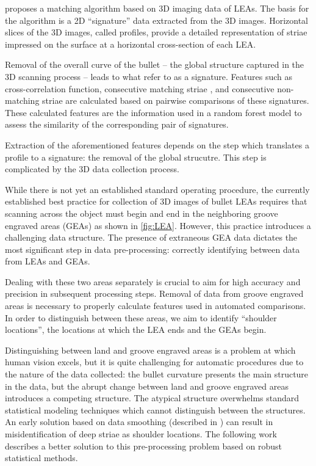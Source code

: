 \documentclass[]{article}
\begin{document}
\citet{Hare1} proposes a matching algorithm based on 3D imaging data of
LEAs. The basis for the algorithm is a 2D ``signature'' data extracted
from the 3D images. Horizontal slices of the 3D images, called profiles,
provide a detailed representation of striae impressed on the surface at
a horizontal cross-section of each LEA.

Removal of the overall curve of the bullet -- the global structure
captured in the 3D scanning process -- leads to what \citet{Hare1} refer
to as a signature. Features such as cross-correlation function,
consecutive matching striae \citep[see][]{Biasotti}, and consecutive
non-matching striae are calculated based on pairwise comparisons of
these signatures. These calculated features are the information used in
a random forest model to assess the similarity of the corresponding pair
of signatures.

Extraction of the aforementioned features depends on the step which
translates a profile to a signature: the removal of the global
strucutre. This step is complicated by the 3D data collection process.

While there is not yet an established standard operating procedure, the
currently established best practice for collection of 3D images of
bullet LEAs requires that scanning across the object must begin and end
in the neighboring groove engraved areas (GEAs) as shown in
\autoref{fig:LEA}. However, this practice introduces a challenging data
structure. The presence of extraneous GEA data dictates the most
significant step in data pre-processing: correctly identifying between
data from LEAs and GEAs.

Dealing with these two areas separately is crucial to aim for high
accuracy and precision in subsequent processing steps. Removal of data
from groove engraved areas is necessary to properly calculate features
used in automated comparisons. In order to distinguish between these
areas, we aim to identify ``shoulder locations'', the locations at which
the LEA ends and the GEAs begin.

Distinguishing between land and groove engraved areas is a problem at
which human vision excels, but it is quite challenging for automatic
procedures due to the nature of the data collected: the bullet curvature
presents the main structure in the data, but the abrupt change between
land and groove engraved areas introduces a competing structure. The
atypical structure overwhelms standard statistical modeling techniques
which cannot distinguish between the structures. An early solution based
on data smoothing (described in \citep{Hare1}) can result in
misidentification of deep striae as shoulder locations. The following
work describes a better solution to this pre-processing problem based on
robust statistical methods.
\end{document}
